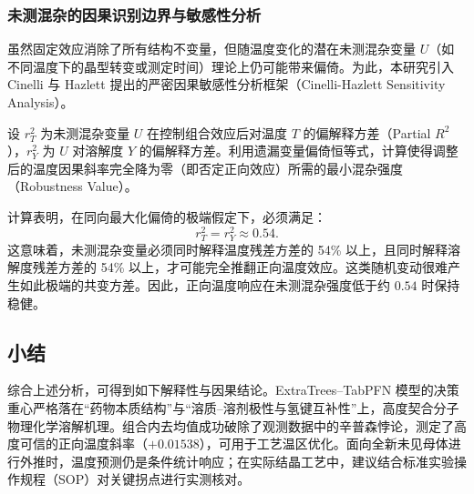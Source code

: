 \subsubsection{未测混杂的因果识别边界与敏感性分析}

虽然固定效应消除了所有结构不变量，但随温度变化的潜在未测混杂变量 $U$（如不同温度下的晶型转变或测定时间）理论上仍可能带来偏倚。为此，本研究引入 Cinelli 与 Hazlett 提出的严密因果敏感性分析框架（Cinelli-Hazlett Sensitivity Analysis\cite{sensitivity2020}）。

设 $r_T^2$ 为未测混杂变量 $U$ 在控制组合效应后对温度 $T$ 的偏解释方差（Partial $R^2$），$r_Y^2$ 为 $U$ 对溶解度 $Y$ 的偏解释方差。利用遗漏变量偏倚恒等式，计算使得调整后的温度因果斜率完全降为零（即否定正向效应）所需的最小混杂强度（Robustness Value）。

计算表明，在同向最大化偏倚的极端假定下，必须满足：
\begin{equation}
r_T^2 = r_Y^2 \approx 0.54.
\end{equation}
这意味着，未测混杂变量必须同时解释温度残差方差的 54\% 以上，且同时解释溶解度残差方差的 54\% 以上，才可能完全推翻正向温度效应。这类随机变动很难产生如此极端的共变方差。因此，正向温度响应在未测混杂强度低于约 $0.54$ 时保持稳健。

\subsection{小结}

综合上述分析，可得到如下解释性与因果结论。ExtraTrees--TabPFN 模型的决策重心严格落在“药物本质结构”与“溶质--溶剂极性与氢键互补性”上，高度契合分子物理化学溶解机理。组合内去均值成功破除了观测数据中的辛普森悖论，测定了高度可信的正向温度斜率（$+0.01538$），可用于工艺温区优化。面向全新未见母体进行外推时，温度预测仍是条件统计响应；在实际结晶工艺中，建议结合标准实验操作规程（SOP）对关键拐点进行实测核对。
